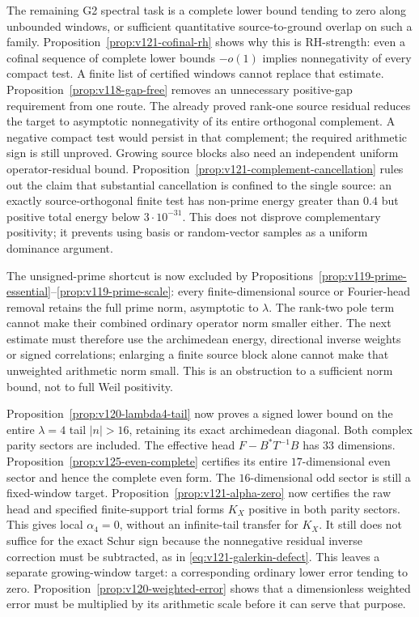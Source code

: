 \documentclass[11pt]{article}
\theoremstyle{remark}
\begin{document}
The remaining G2 spectral task is a complete lower bound tending to
zero along unbounded windows, or sufficient quantitative source-to-ground
overlap on such a family. Proposition~\ref{prop:v121-cofinal-rh}
shows why this is RH-strength: even a cofinal sequence of complete
lower bounds $-o(1)$ implies nonnegativity of every compact test.
A finite list of certified windows cannot replace that estimate.
Proposition~\ref{prop:v118-gap-free} removes an unnecessary positive-gap
requirement from one route. The already proved rank-one source residual
reduces the target to asymptotic nonnegativity of its entire orthogonal
complement. A negative compact test would persist in that complement;
the required arithmetic sign is still unproved. Growing source blocks
also need an independent uniform operator-residual bound.
Proposition~\ref{prop:v121-complement-cancellation} rules out the
claim that substantial cancellation is confined to the single source:
an exactly source-orthogonal finite test has non-prime energy greater
than $0.4$ but positive total energy below $3\cdot10^{-31}$.
This does not disprove complementary positivity; it prevents using
basis or random-vector samples as a uniform dominance argument.

The unsigned-prime shortcut is now excluded by
Propositions~\ref{prop:v119-prime-essential}--\ref{prop:v119-prime-scale}:
every finite-dimensional source or Fourier-head removal retains the
full prime norm, asymptotic to $\lambda$. The rank-two pole term cannot
make their combined ordinary operator norm smaller either. The next
estimate must therefore use the archimedean energy, directional inverse
weights or signed correlations; enlarging a finite source block alone
cannot make that unweighted arithmetic norm small. This is an
obstruction to a sufficient norm bound, not to full Weil positivity.

Proposition~\ref{prop:v120-lambda4-tail} now proves a signed lower
bound on the entire $\lambda=4$ tail $|n|>16$, retaining its exact
archimedean diagonal. Both complex parity sectors are included.
The effective head $F-B^*T^{-1}B$ has $33$ dimensions.
Proposition~\ref{prop:v125-even-complete} certifies its entire
$17$-dimensional even sector and hence the complete even form.
The $16$-dimensional odd sector is still a fixed-window target. Proposition~\ref{prop:v121-alpha-zero} now certifies the
raw head and specified finite-support trial forms $K_X$ positive in
both parity sectors. This gives local $\alpha_4=0$, without an
infinite-tail transfer for $K_X$. It still does not suffice for the
exact Schur sign because the nonnegative residual inverse correction
must be subtracted, as in \eqref{eq:v121-galerkin-defect}.
This leaves a separate growing-window target: a corresponding ordinary
lower error tending to zero. Proposition~\ref{prop:v120-weighted-error}
shows that a dimensionless weighted error must be multiplied by its
arithmetic scale before it can serve that purpose.
\end{document}
